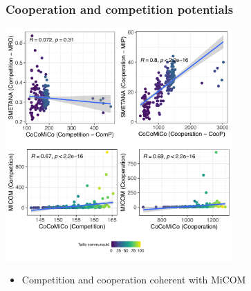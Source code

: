 \documentclass[8pt,usenames,dvipsnames]{beamer}
\begin{document}
\begin{frame}
\frametitle{Cooperation and competition potentials}
\centering
\includegraphics[width=0.65\textwidth]{figures/ccmc-micom-smetana.pdf}
\begin{block}{}
\begin{itemize}
\item Competition and cooperation coherent with MiCOM
\end{itemize}
\end{block}
\end{frame}
\end{document}
